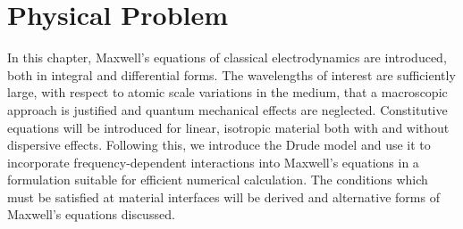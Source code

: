 \chapter{Physical Problem}
\label{PhysicalProblemChapter}
 In this chapter, Maxwell's equations
of classical electrodynamics are introduced, both in integral and differential
forms. The wavelengths of interest are sufficiently large, with
respect to atomic scale variations in the medium, that a macroscopic approach is
justified and quantum mechanical effects are neglected. Constitutive
equations will be introduced for linear, isotropic material both with and
without dispersive effects. Following this, we introduce the Drude model and use it
to incorporate frequency-dependent interactions into Maxwell's
equations in a formulation suitable for efficient numerical calculation. The
conditions which must be satisfied at material interfaces will be derived and
alternative forms of Maxwell's equations discussed.

